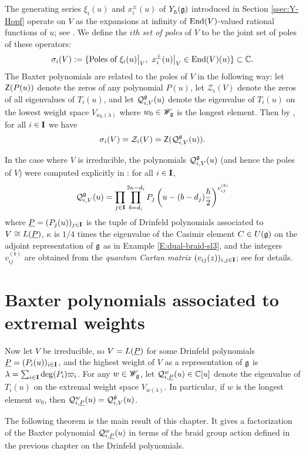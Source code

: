 The generating series $\xi_i(u)$ and $x^\pm_i(u)$ of $Y_\hbar^{}(\mathfrak{g})$ introduced in Section \ref{ssec:Y-Hopf} operate on $V$ as the expansions at infinity of $\operatorname{End}(V)$-valued rational functions of $u$; see \cite[Prop. 3.6]{gautam_yangians_2016}.
We define the \emph{$i$th set of poles} of $V$ to be the joint set of poles of these operators:
\[\sigma_i(V) := \{\text{Poles of } \xi_i(u)\big|_V,\ x^\pm_i(u)\big|_V \in\operatorname{End}(V)(u)\} \subset\mathbb{C}.\]
The Baxter polynomials are related to the poles of $V$ in the following way: let $\mathsf{Z}(P(u))$ denote the zeros of any polynomial $P(u)$, let $\mathcal{Z}_i(V)$ denote the zeros of all eigenvalues of $T_i(u)$, and let $\mathcal{Q}_{i,V}^{\mathfrak{g}}(u)$ denote the eigenvalue of $T_i(u)$ on the lowest weight space $V_{w_0(\lambda)}$ where $w_0\in\mathscr{W}_{\mathfrak{g}}$ is the longest element.
Then by \cite[Thm. 4.4]{gautam_poles_2023}, for all $i\in\mathbf{I}$ we have
\[\sigma_i(V) = \mathcal{Z}_i(V) = \mathsf{Z}(\mathcal{Q}_{i,V}^{\mathfrak{g}}(u)).\]

In the case where $V$ is irreducible, the polynomials $\mathcal{Q}_{i,V}^{\mathfrak{g}}(u)$ (and hence the poles of $V$) were computed explicitly in \cite[Thm. 5.2]{gautam_poles_2023}: for all $i\in\mathbf{I}$,
\[\mathcal{Q}_{i,V}^{\mathfrak{g}}(u) = \prod_{j\in\mathbf{I}}\prod_{b=d_i}^{2\kappa-d_i} P_j\left(u-(b-d_j)\frac{\hbar}{2}\right)^{v_{ij}^{(b)}}\]
where $\underline{P}=(P_j(u))_{j\in\mathbf{I}}$ is the tuple of Drinfeld polynomials associated to $V\cong L(\underline{P})$, $\kappa$ is $1/4$ times the eigenvalue of the Casimir element $C\in U(\mathfrak{g})$ on the adjoint representation of $\mathfrak{g}$ as in Example \ref{E:dual-braid-sl3}, and the integers $v_{ij}^{(b)}$ are obtained from the \emph{quantum Cartan matrix} $(v_{ij}(z))_{i,j\in\mathbf{I}}$; see \cite[\S 5.2]{friesen_braid_2024} for details.


\section{Baxter polynomials associated to extremal weights}

Now let $V$ be irreducible, so $V=L(\underline{P})$ for some Drinfeld polynomials $\underline{P}=(P_i(u))_{i\in\mathbf{I}}$, and the highest weight of $V$ as a representation of $\mathfrak{g}$ is $\lambda = \sum_{i\in\mathbf{I}}\deg(P_i)\varpi_i$.
For any $w\in\mathscr{W}_{\mathfrak{g}}$, let $\mathcal{Q}_{i,\underline{P}}^w(u)\in\mathbb{C}[u]$ denote the eigenvalue of $T_i(u)$ on the extremal weight space $V_{w(\lambda)}$.
In particular, if $w$ is the longest element $w_0$, then $\mathcal{Q}_{i,\underline{P}}^w(u) = \mathcal{Q}_{i,V}^{\mathfrak{g}}(u)$.

The following theorem is the main result of this chapter.
It gives a factorization of the Baxter polynomial $\mathcal{Q}_{i,\underline{P}}^w(u)$ in terms of the braid group action defined in the previous chapter on the Drinfeld polynomials.

